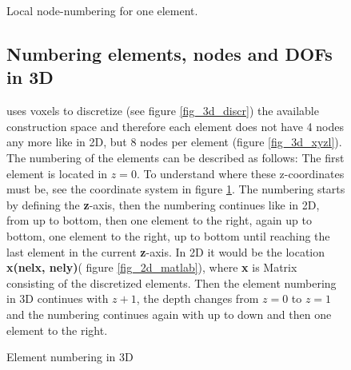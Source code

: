  \begin{figure} [!h]
\begin{minipage}{0.6 \textwidth}
 \centering
 \def\svgwidth{0.6\textwidth}
 
 \caption{Local node-numbering for one element.}  
 \label{fig_3d_xyzl}          %
 \vspace{1cm}
  \def\svgwidth{0.8\textwidth}
 
 \caption{Element numbering in 3D}  
 \label{fig_3d_element_numberin}          %
\end{minipage}
\begin{minipage}{0.35 \textwidth}
   \subsection{Numbering elements, nodes and DOFs in 3D}
\cite{Liu.2014} uses voxels to discretize 
(see figure \ref{fig_3d_discr})
 the available construction space 
 and therefore each element 
 does not have 4 nodes any more 
 like in 2D, but 8 nodes per element (figure \ref{fig_3d_xyzl}).\\

The numbering of the elements can be described as follows: The first element is located in \textbf{$z=0$}. To understand where 
these z-coordinates must be, see the coordinate system in figure \ref{fig_3d_element_numberin}. The 
numbering starts by defining the \textbf{z}-axis, then the 
numbering continues like in 2D, from up to bottom,
then one element to the right, again up to bottom,
 one element to the right, up to bottom until reaching
  the last element in the current \textbf{z}-axis. In 2D it would be the location \textbf{x(nelx, nely)}( figure \ref{fig_2d_matlab}), where \textbf{x} is Matrix consisting of the discretized elements. Then the element numbering in 3D continues with \textbf{$z+1$}, the depth changes from
  \textbf{$z = 0$} to \textbf{$z=1$} and the numbering
  continues again with up to down and then one element to the right.
\end{minipage}
\end{figure}
\newpage


